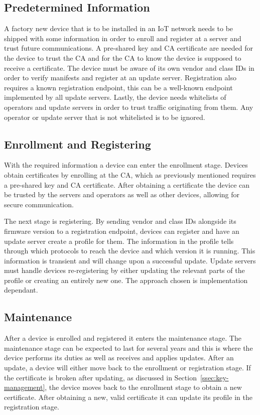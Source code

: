 \documentclass[0-thesis.tex]{subfiles}
\begin{document}
\subsection{Predetermined Information}
\label{ssec:predetermined-information}
A factory new device that is to be installed in an IoT network needs to be shipped with
some information in order to enroll and register at a server and trust future
communications. A pre-shared key and CA certificate are needed for the device to trust the
CA and for the CA to know the device is supposed to receive a certificate. The device must
be aware of its own vendor and class IDs in order to verify manifests and register at an
update server. Registration also requires a known registration endpoint, this can be a
well-known endpoint implemented by all update servers. Lastly, the device needs whitelists
of operators and update servers in order to trust traffic originating from them. Any
operator or update server that is not whitelisted is to be ignored.

\subsection{Enrollment and Registering}
\label{ssec:enrollment-registering}
With the required information a device can enter the enrollment stage. Devices obtain
certificates by enrolling at the CA, which as previously mentioned requires a pre-shared
key and CA certificate. After obtaining a certificate the device can be trusted by the
servers and operators as well as other devices, allowing for secure communication.

The next stage is registering. By sending vendor and class IDs alongside its firmware
version to a registration endpoint, devices can register and have an update server create
a profile for them. The information in the profile tells through which protocols to reach
the device and which version it is running. This information is transient and will change
upon a successful update. Update servers must handle devices re-registering by either
updating the relevant parts of the profile or creating an entirely new one. The approach
chosen is implementation dependant.

\subsection{Maintenance}
\label{ssec:maintenance}
After a device is enrolled and registered it enters the maintenance stage. The maintenance
stage can be expected to last for several years and this is where the device performs its
duties as well as receives and applies updates. After an update, a device will either move
back to the enrollment or registration stage. If the certificate is broken after updating,
as discussed in Section~\ref{ssec:key-management}, the device moves back to the enrollment
stage to obtain a new certificate. After obtaining a new, valid certificate it can update
its profile in the registration stage. 
\end{document}
